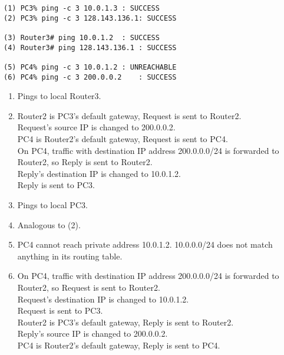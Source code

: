 \begin{lstlisting}
(1) PC3% ping -c 3 10.0.1.3	: SUCCESS
(2) PC3% ping -c 3 128.143.136.1: SUCCESS

(3) Router3# ping 10.0.1.2	: SUCCESS
(4) Router3# ping 128.143.136.1	: SUCCESS

(5) PC4% ping -c 3 10.0.1.2	: UNREACHABLE
(6) PC4% ping -c 3 200.0.0.2	: SUCCESS
\end{lstlisting}

\begin{enumerate}
\item Pings to local Router3.
\item Router2 is PC3's default gateway, Request is sent to Router2. \\
      Request's source IP is changed to 200.0.0.2. \\ 
      PC4 is Router2's default gateway, Request is sent to PC4. \\
      On PC4, traffic with destination IP address 200.0.0.0/24 is forwarded to Router2, so Reply is sent to Router2. \\
      Reply's destination IP is changed to 10.0.1.2. \\
      Reply is sent to PC3.
\item Pings to local PC3.
\item Analogous to (2).
\item PC4 cannot reach private address 10.0.1.2. 10.0.0.0/24 does not match anything in its routing table.
\item On PC4, traffic with destination IP address 200.0.0.0/24 is forwarded to Router2, so Request is sent to Router2. \\
      Request's destination IP is changed to 10.0.1.2. \\
      Request is sent to PC3. \\
      Router2 is PC3's default gateway, Reply is sent to Router2. \\
      Reply's source IP is changed to 200.0.0.2. \\ 
      PC4 is Router2's default gateway, Reply is sent to PC4. \\
\end{enumerate}
